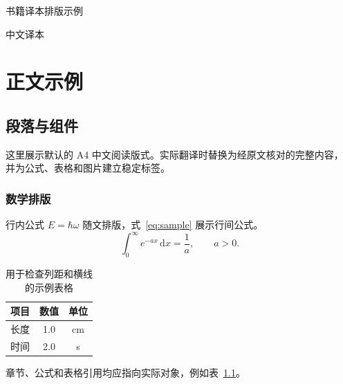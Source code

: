 \documentclass[UTF8,11pt,a4paper,twoside,openright,fontset=fandol]{ctexbook}
\begin{document}
\frontmatter
\begin{titlepage}
  \centering
  \vspace*{30mm}
  {\heiti\fontsize{24}{32}\selectfont 书籍译本排版示例\par}
  \vspace{12mm}
  {\large 中文译本\par}
  \vfill
\end{titlepage}
\tableofcontents
\mainmatter
\chapter{正文示例}\label{ch:sample}
\section{段落与组件}\label{sec:components}
这里展示默认的 A4 中文阅读版式。实际翻译时替换为经原文核对的完整内容，
并为公式、表格和图片建立稳定标签。
\subsection{数学排版}\label{subsec:math}
行内公式 \(E=\hbar\omega\) 随文排版，式~\eqref{eq:sample} 展示行间公式。
\begin{equation}
  \int_0^\infty e^{-a x}\,\mathrm{d}x=\frac{1}{a},\qquad a>0 .
  \label{eq:sample}
\end{equation}
\begin{table}[htbp]
  \centering
  \caption{用于检查列距和横线的示例表格}\label{tab:sample}
  \begin{tabular}{lcc}
    \toprule
    项目 & 数值 & 单位 \\
    \midrule
    长度 & 1.0 & cm \\
    时间 & 2.0 & s \\
    \bottomrule
  \end{tabular}
\end{table}
章节、公式和表格引用均应指向实际对象，例如表~\ref{tab:sample}。
\end{document}
